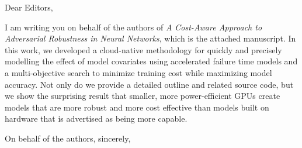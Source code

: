 \documentclass{letter}
\begin{document}
\begin{letter}{}
\opening{Dear Editors,}

I am writing you on behalf of the authors of \textit{A Cost-Aware Approach to Adversarial Robustness in Neural Networks}, which is the attached manuscript.  In this work, we developed a cloud-native methodology for quickly and precisely modelling the effect of model covariates using accelerated failure time models and a multi-objective search to minimize training cost while maximizing model accuracy. Not only do we provide a detailed outline and related source code, but we show the surprising result that smaller, more power-efficient GPUs create models that are more robust and more cost effective than models built on hardware that is advertised as being more capable.


\closing{On behalf of the authors, sincerely,}
\end{letter}
\end{document}
